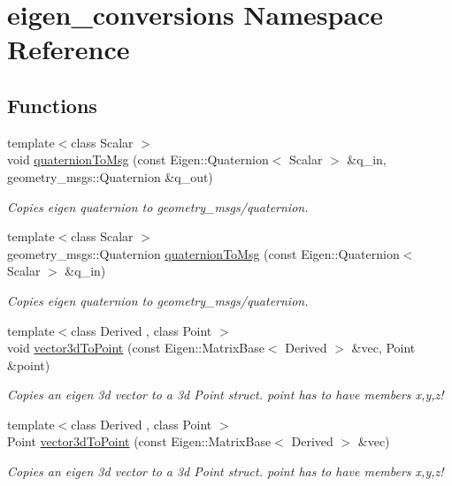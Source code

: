 \hypertarget{namespaceeigen__conversions}{\section{eigen\-\_\-conversions Namespace Reference}
\label{namespaceeigen__conversions}
}
\subsection*{Functions}
\begin{DoxyCompactItemize}
\item 
{\footnotesize template$<$class Scalar $>$ }\\void \hyperlink{namespaceeigen__conversions_adbf4e3b639a8f2024e965bd986e86197}{quaternion\-To\-Msg} (const Eigen\-::\-Quaternion$<$ Scalar $>$ \&q\-\_\-in, geometry\-\_\-msgs\-::\-Quaternion \&q\-\_\-out)
\begin{DoxyCompactList}\small\item\em Copies eigen quaternion to geometry\-\_\-msgs/quaternion. \end{DoxyCompactList}\item 
{\footnotesize template$<$class Scalar $>$ }\\geometry\-\_\-msgs\-::\-Quaternion \hyperlink{namespaceeigen__conversions_ad0e3d903601fdea34507ed43652796f5}{quaternion\-To\-Msg} (const Eigen\-::\-Quaternion$<$ Scalar $>$ \&q\-\_\-in)
\begin{DoxyCompactList}\small\item\em Copies eigen quaternion to geometry\-\_\-msgs/quaternion. \end{DoxyCompactList}\item 
{\footnotesize template$<$class Derived , class Point $>$ }\\void \hyperlink{namespaceeigen__conversions_a2e7baf949ffe127d7d8b67b674e04ee7}{vector3d\-To\-Point} (const Eigen\-::\-Matrix\-Base$<$ Derived $>$ \&vec, Point \&point)
\begin{DoxyCompactList}\small\item\em Copies an eigen 3d vector to a 3d Point struct. point has to have members x,y,z! \end{DoxyCompactList}\item 
{\footnotesize template$<$class Derived , class Point $>$ }\\Point \hyperlink{namespaceeigen__conversions_adc9edb3b9e4232c9d973b1b33a280136}{vector3d\-To\-Point} (const Eigen\-::\-Matrix\-Base$<$ Derived $>$ \&vec)
\begin{DoxyCompactList}\small\item\em Copies an eigen 3d vector to a 3d Point struct. point has to have members x,y,z! \end{DoxyCompactList}\end{DoxyCompactItemize}


